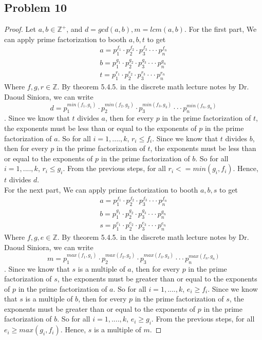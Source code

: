 \documentclass[a4paper,12pt]{article}
\begin{document}
\subsection*{Problem 10}
\begin{proof}
   Let $a,b \in \mathbb{Z^+}$, and $d= gcd(a,b), m=lcm(a,b)$. For the first part, We can apply prime factorization to booth $a,b,t$ to get \begin{align*}a=p_1^{f_1} \cdot p_2^{f_2}\cdot p_3^{f_3}\cdot \cdot \cdot p_n^{f_n}\\ b=p_1^{g_1}\cdot p_2^{g_2}\cdot p_3^{g_3}\cdot \cdot \cdot p_n^{g_n}\\ t=p_1^{r_1}\cdot p_2^{r_2}\cdot p_3^{r_3}\cdot \cdot \cdot p_n^{r_n}\end{align*} Where $f,g,r \in \mathbb{Z}.$ By theorem 5.4.5. in the discrete math lecture notes by Dr. Daoud Siniora, we can write \[d=p_1^{min(f_1, g_1)}\cdot p_2^{min(f_2, g_2)}\cdot p_3^{min(f_3, g_3)}\cdot \cdot \cdot p_n^{min(f_n,g_n)}\].
Since we know that $t$ divides $a$, then for every $p$ in the prime factorization of $t$, the exponents must be less than or equal to the exponents of $p$ in the prime factorization of $a$. So for all $i=1,....,k$, $r_i\leq f_i$.
Since we know that $t$ divides $b$, then for every $p$ in the prime factorization of $t$, the exponents must be less than or equal to the exponents of $p$ in the prime factorization of $b$. So for all $i=1,....,k$, $r_i\leq g_i$. From the previous steps, for all $r_i<=min(g_i, f_i).$ Hence, $t$ divides $d.$
\\For the next part, We can apply prime factorization to booth $a,b,s$ to get \begin{align*}a=p_1^{f_1}\cdot p_2^{f_2}\cdot p_3^{f_3}\cdot \cdot \cdot p_n^{f_n}\\ b=p_1^{g_1}\cdot p_2^{g_2}\cdot p_3^{g_3}\cdot \cdot \cdot p_n^{g_n}\\ s=p_1^{e_1}\cdot p_2^{e_2} \cdot p_3^{e_3} \cdot \cdot \cdot p_n^{e_n}\end{align*} Where $f,g,e \in \mathbb{Z}.$ By theorem 5.4.5. in the discrete math lecture notes by Dr. Daoud Siniora, we can write \[m=p_1^{max(f_1, g_1)}\cdot p_2^{max(f_2, g_2)}\cdot p_3^{max(f_3, g_3)}\cdot \cdot \cdot p_n^{max(f_n,g_n)}\].
Since we know that $s$ is a multiple of $a$, then for every $p$ in the prime factorization of $s$, the exponents must be greater than or equal to the exponents of $p$ in the prime factorization of $a$. So for all $i=1,....,k$, $e_i\geq f_i$.
Since we know that $s$ is a multiple of $b$, then for every $p$ in the prime factorization of $s$, the exponents must be greater than or equal to the exponents of $p$ in the prime factorization of $b$. So for all $i=1,....,k$, $e_i\geq g_i$. From the previous steps, for all $e_i\geq max(g_i, f_i).$ Hence, $s$ is a multiple of $m.$ 
\end{proof}
\end{document}
